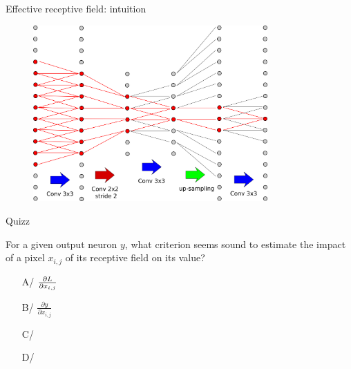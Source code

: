 \documentclass[xcolor=pdftex,dvipsnames,table,mathserif]{beamer}
\begin{document}
\begin{frame}{Effective receptive field: intuition}

  \begin{figure}
    \includegraphics[width=0.8\textwidth]{receptive_field3.png}
  \end{figure}

\end{frame}

\begin{frame}{Quizz}

  \begin{block}{For a given output neuron $y$, what criterion seems sound to estimate the impact of a pixel $x_{i,j}$ of its receptive field on its value?}
    \begin{itemize}
    \item[A/] $\frac{\partial L}{\partial x_{i,j}}$
    \item[B/] $\frac{\partial y}{\partial x_{i,j}}$
    \item[C/]
    \item[D/]
    \end{itemize}

  \end{block}

\end{frame}
\end{document}
